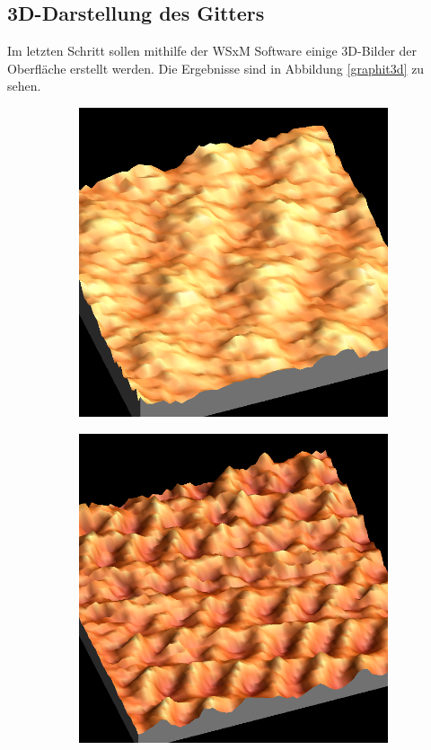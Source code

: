 \subsection{3D-Darstellung des Gitters}
Im letzten Schritt sollen mithilfe der WSxM Software einige 3D-Bilder der 
Oberfläche erstellt werden. Die Ergebnisse sind in Abbildung \ref{graphit3d}
zu sehen.
\begin{figure}[h]
    \begin{subfigure}[c]{0.5\textwidth}
        \centering
        \includegraphics[width=\textwidth]{Mess/graphit3d.bmp}
    \end{subfigure}
    \begin{subfigure}[c]{0.5\textwidth}
        \includegraphics[width=\textwidth]{Mess/graphit3d2.bmp}

\end{subfigure}
\end{figure}

